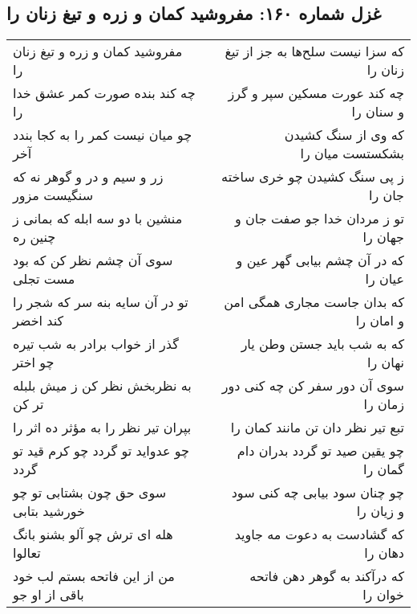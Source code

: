 \begin{center}
\section*{غزل شماره ۱۶۰: مفروشید کمان و زره و تیغ زنان را}
\label{sec:0160}
\begin{longtable}{l p{0.5cm} r}
مفروشید کمان و زره و تیغ زنان را
&&
که سزا نیست سلح‌ها به جز از تیغ زنان را
\\
چه کند بنده صورت کمر عشق خدا را
&&
چه کند عورت مسکین سپر و گرز و سنان را
\\
چو میان نیست کمر را به کجا بندد آخر
&&
که وی از سنگ کشیدن بشکستست میان را
\\
زر و سیم و در و گوهر نه که سنگیست مزور
&&
ز پی سنگ کشیدن چو خری ساخته جان را
\\
منشین با دو سه ابله که بمانی ز چنین ره
&&
تو ز مردان خدا جو صفت جان و جهان را
\\
سوی آن چشم نظر کن که بود مست تجلی
&&
که در آن چشم بیابی گهر عین و عیان را
\\
تو در آن سایه بنه سر که شجر را کند اخضر
&&
که بدان جاست مجاری همگی امن و امان را
\\
گذر از خواب برادر به شب تیره چو اختر
&&
که به شب باید جستن وطن یار نهان را
\\
به نظربخش نظر کن ز میش بلبله تر کن
&&
سوی آن دور سفر کن چه کنی دور زمان را
\\
بپران تیر نظر را به مؤثر ده اثر را
&&
تبع تیر نظر دان تن مانند کمان را
\\
چو عدواید تو گردد چو کرم قید تو گردد
&&
چو یقین صید تو گردد بدران دام گمان را
\\
سوی حق چون بشتابی تو چو خورشید بتابی
&&
چو چنان سود بیابی چه کنی سود و زیان را
\\
هله ای ترش چو آلو بشنو بانگ تعالوا
&&
که گشادست به دعوت مه جاوید دهان را
\\
من از این فاتحه بستم لب خود باقی از او جو
&&
که درآکند به گوهر دهن فاتحه خوان را
\\
\end{longtable}
\end{center}

